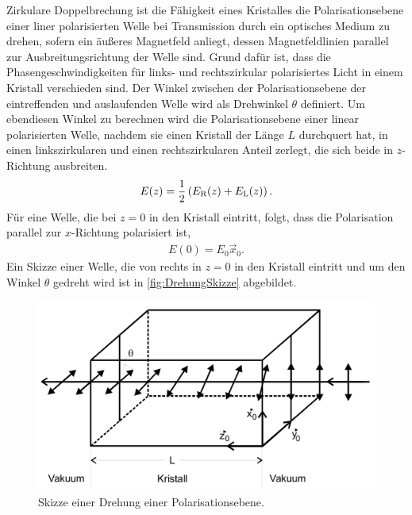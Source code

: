 Zirkulare Doppelbrechung ist die Fähigkeit eines Kristalles die Polarisationsebene einer liner polarisierten Welle bei Transmission durch ein optisches Medium zu drehen, sofern
ein äußeres Magnetfeld anliegt, dessen Magnetfeldlinien parallel zur Ausbreitungsrichtung der Welle sind. Grund dafür ist, dass die Phasengeschwindigkeiten für links- und 
rechtszirkular polarisiertes Licht in einem Kristall verschieden sind. Der Winkel zwischen der Polarisationsebene der eintreffenden und auslaufenden Welle wird als
Drehwinkel $\theta$ definiert. Um ebendiesen Winkel zu berechnen wird die Polarisationsebene einer linear polarisierten Welle, nachdem sie einen Kristall der Länge $L$ 
durchquert hat, in einen linkszirkularen und einen rechtszirkularen Anteil zerlegt, die sich beide in $z$-Richtung ausbreiten.
\begin{align}
    \label{eq:PolAnteil}
    E(z)= \frac 12 \left(E_{\text R}(z)+E_{\text L}(z)\right).
\end{align}
Für eine Welle, die bei $z=0$ in den Kristall eintritt, folgt, dass die Polarisation parallel zur $x$-Richtung polarisiert ist,
\begin{align}
    E(0)=E_0\vec x_0.
\end{align}
Ein Skizze einer Welle, die von rechts in $z=0$ in den Kristall eintritt und um den Winkel $\theta$ gedreht wird ist in \autoref{fig:DrehungSkizze} abgebildet.
\begin{figure}[H]
	\centering
	\includegraphics[width=0.6\linewidth]{data/PolarisationDrehung.png}
	\caption{Skizze einer Drehung einer Polarisationsebene.\cite{Anleitung46}}
	\label{fig:DrehungSkizze}
\end{figure}

